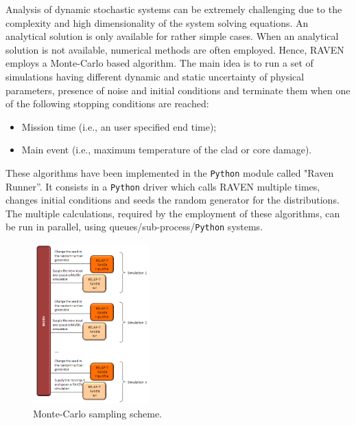 \documentclass{mc2013}
\begin{document}
\label{sec:pyhtonCalcDriver}
Analysis of dynamic stochastic systems can be extremely challenging due to the complexity and high dimensionality of the system solving equations. An analytical solution is only available for rather simple cases. When an analytical solution is not available, numerical methods are often employed. 
Hence, RAVEN employs a Monte-Carlo based algorithm. 
The main idea is to run a set of simulations having different dynamic and static uncertainty of physical parameters, presence of noise and initial conditions and terminate them when one of the following stopping conditions are reached:
\begin{itemize}
\item Mission time (i.e., an user specified end time);
\item Main event (i.e., maximum temperature of the clad or core damage).
\end{itemize}
These algorithms have been implemented in the \verb!Python! module called "Raven Runner''. It consists in a \verb!Python! driver which calls RAVEN multiple times, changes initial conditions and seeds the random generator for the distributions.
The multiple calculations, required by the employment of these algorithms, can be run in parallel, using queues/sub-process/\verb!Python! systems.  

\begin{figure}[h]
\centering
\includegraphics[width=0.4\textwidth]{figures/sampling_mc.PNG}
\caption{Monte-Carlo sampling scheme.}
\label{fig:MCsampling}
\end{figure}
\end{document}
